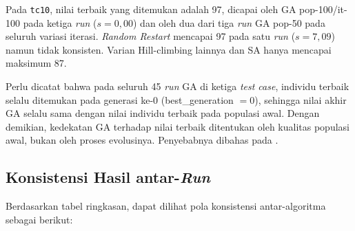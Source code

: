 Pada \texttt{tc10}, nilai terbaik yang ditemukan adalah 97, dicapai oleh GA pop-100/it-100 pada ketiga \textit{run} ($s = 0{,}00$) dan oleh dua dari tiga \textit{run} GA pop-50 pada seluruh variasi iterasi. \textit{Random Restart} mencapai 97 pada satu \textit{run} ($s = 7{,}09$) namun tidak konsisten. Varian Hill-climbing lainnya dan SA hanya mencapai maksimum 87.

Perlu dicatat bahwa pada seluruh 45 \textit{run} GA di ketiga \textit{test case}, individu terbaik selalu ditemukan pada generasi ke-0 (best\_generation $= 0$), sehingga nilai akhir GA selalu sama dengan nilai individu terbaik pada populasi awal. Dengan demikian, kedekatan GA terhadap nilai terbaik ditentukan oleh kualitas populasi awal, bukan oleh proses evolusinya. Penyebabnya dibahas pada .

\subsection{Konsistensi Hasil antar-\textit{Run}}

Berdasarkan tabel ringkasan, dapat dilihat pola konsistensi antar-algoritma sebagai berikut:


